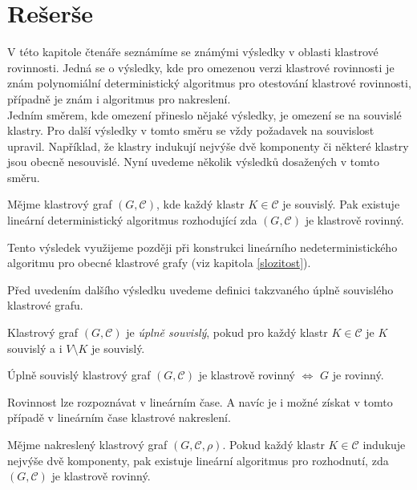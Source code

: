\chapter{Rešerše}
V této kapitole čtenáře seznámíme se známými výsledky v oblasti klastrové rovinnosti. Jedná se o výsledky, kde pro omezenou verzi klastrové rovinnosti je znám polynomiální deterministický algoritmus pro otestování klastrové rovinnosti, případně je znám i algoritmus pro nakreslení.\\

Jedním směrem, kde omezení přineslo nějaké výsledky, je omezení se na souvislé klastry. Pro další výsledky v tomto směru se vždy požadavek na souvislost upravil. Například, že klastry indukují nejvýše dvě komponenty či některé klastry jsou obecně nesouvislé. Nyní uvedeme několik výsledků dosažených v tomto směru.

\begin{theorem}
\label{souv_klastry_det_alg}
Mějme klastrový graf $(G, \mathcal C)$, kde každý klastr $K \in \mathcal C$ je souvislý. Pak existuje lineární deterministický algoritmus rozhodující zda $(G, \mathcal C)$ je klastrově rovinný.
\end{theorem}

Tento výsledek využijeme později při konstrukci lineárního nedeterministického algoritmu pro obecné klastrové grafy (viz kapitola \ref{slozitost}).

Před uvedením dalšího výsledku uvedeme definici takzvaného úplně souvislého klastrové grafu.

\begin{defn}
Klastrový graf $(G, \mathcal C)$ je \textit{úplně souvislý}, pokud pro každý klastr $K \in \mathcal C$ je $K$ souvislý a i $V \setminus K$ je souvislý.
\end{defn}

\begin{theorem}
Úplně souvislý klastrový graf $(G, \mathcal C)$ je  klastrově rovinný $\iff$ $G$ je rovinný.
\end{theorem}

Rovinnost lze rozpoznávat v lineárním čase. A navíc je i možné získat v tomto případě v lineárním čase klastrové nakreslení.

\begin{theorem}
Mějme nakreslený klastrový graf $(G, \mathcal C, \rho)$. Pokud každý klastr $K \in \mathcal C$ indukuje nejvýše dvě komponenty, pak existuje lineární algoritmus pro rozhodnutí, zda $(G, \mathcal C)$ je klastrově rovinný.
\end{theorem}

